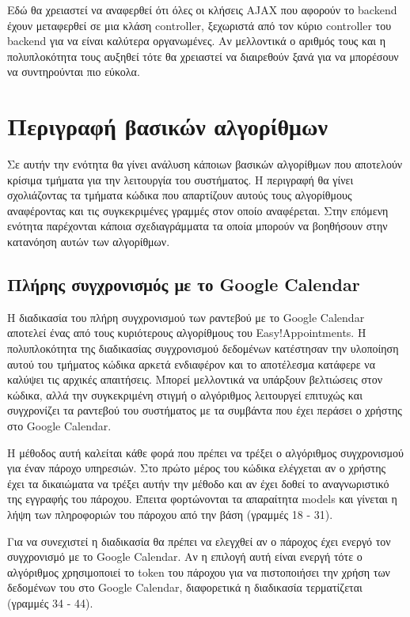 Εδώ θα χρειαστεί να αναφερθεί ότι όλες οι κλήσεις AJAX που αφορούν το backend έχουν μεταφερθεί σε μια κλάση controller, ξεχωριστά από τον κύριο controller του backend για να είναι καλύτερα οργανωμένες. Αν μελλοντικά ο αριθμός τους και η πολυπλοκότητα τους αυξηθεί τότε θα χρειαστεί να διαιρεθούν ξανά για να μπορέσουν να συντηρούνται πιο εύκολα.

\section{Περιγραφή βασικών αλγορίθμων}
Σε αυτήν την ενότητα θα γίνει ανάλυση κάποιων βασικών αλγορίθμων που αποτελούν κρίσιμα τμήματα για την λειτουργία του συστήματος. Η περιγραφή θα γίνει σχολιάζοντας τα τμήματα κώδικα που απαρτίζουν αυτούς τους αλγορίθμους αναφέροντας και τις συγκεκριμένες γραμμές στον οποίο αναφέρεται. Στην επόμενη ενότητα παρέχονται κάποια σχεδιαγράμματα τα οποία μπορούν να βοηθήσουν στην κατανόηση αυτών των αλγορίθμων.

\subsection{Πλήρης συγχρονισμός με το Google Calendar}
Η διαδικασία του πλήρη συγχρονισμού των ραντεβού με το Google Calendar αποτελεί ένας από τους κυριότερους αλγορίθμους του Easy!Appointments. Η πολυπλοκότητα της διαδικασίας συγχρονισμού δεδομένων κατέστησαν την υλοποίηση αυτού του τμήματος κώδικα αρκετά ενδιαφέρον και το αποτέλεσμα κατάφερε να καλύψει τις αρχικές απαιτήσεις. Μπορεί μελλοντικά να υπάρξουν βελτιώσεις στον κώδικα, αλλά την συγκεκριμένη στιγμή ο αλγόριθμος λειτουργεί επιτυχώς και συγχρονίζει τα ραντεβού του συστήματος με τα συμβάντα που έχει περάσει ο χρήστης στο Google Calendar.



Η μέθοδος αυτή καλείται κάθε φορά που πρέπει να τρέξει ο αλγόριθμος συγχρονισμού για έναν πάροχο υπηρεσιών. Στο πρώτο μέρος του κώδικα ελέγχεται αν ο χρήστης έχει τα δικαιώματα να τρέξει αυτήν την μέθοδο και αν έχει δοθεί το αναγνωριστικό της εγγραφής του πάροχου. Έπειτα φορτώνονται τα απαραίτητα models και γίνεται η λήψη των πληροφοριών του πάροχου από την βάση (γραμμές 18 - 31). 

Για να συνεχιστεί η διαδικασία θα πρέπει να ελεγχθεί αν ο πάροχος έχει ενεργό τον συγχρονισμό με το Google Calendar. Αν η επιλογή αυτή είναι ενεργή τότε ο αλγόριθμος χρησιμοποιεί το token του πάροχου για να πιστοποιήσει την χρήση των δεδομένων του στο Google Calendar, διαφορετικά η διαδικασία τερματίζεται (γραμμές 34 - 44). 

